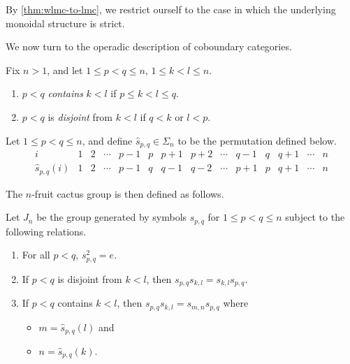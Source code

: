 \begin{rem}
By \cref{thm:wlmc-to-lmc}, we restrict ourself to the case in which the underlying monoidal structure is strict.
\end{rem}

We now turn to the operadic description of coboundary categories.

\begin{Defi}
Fix $n>1$, and let $1 \leq p < q \leq n$, $1 \leq k < l \leq n$.
\begin{enumerate}
\item $p<q$ \textit{contains} $k<l$ if $p \leq k < l \leq q$.
\item $p<q$ is \textit{disjoint} from $k<l$ if $q<k$ or $l<p$.
\end{enumerate}
\end{Defi}

\begin{Defi}
Let $1 \leq p < q \leq n$, and define $\hat{s}_{p,q} \in \Sigma_{n}$ to be the permutation defined below.
  \[
    \begin{array}{r|ccccccccccccc}
      i & 1 & 2 & \cdots & p-1 & p & p+1 & p+2 & \cdots & q-1 & q & q+1 & \cdots & n \\
      \hat{s}_{p,q}(i) & 1 & 2 & \cdots & p-1 & q & q-1 & q-2 & \cdots & p+1 & p & q+1 & \cdots & n
    \end{array}
  \]
\end{Defi}

The $n$-fruit cactus group is then defined as follows.

\begin{Defi}\label{Defi:defcactus}
Let $J_{n}$ be the group generated by symbols $s_{p,q}$ for $1 \leq p < q \leq n$ subject to the following relations.
  \begin{enumerate}
    \item For all $p < q$, $s_{p,q}^{2}=e$.
    \item If $p<q$ is disjoint from $k<l$, then $s_{p,q}s_{k,l} = s_{k,l}s_{p,q}$.
    \item If $p<q$ contains $k<l$, then $s_{p,q}s_{k,l} = s_{m,n}s_{p,q}$ where
      \begin{itemize}
        \item $m = \hat{s}_{p,q}(l)$ and
        \item $n = \hat{s}_{p,q}(k)$.
      \end{itemize}
  \end{enumerate}
\end{Defi}

